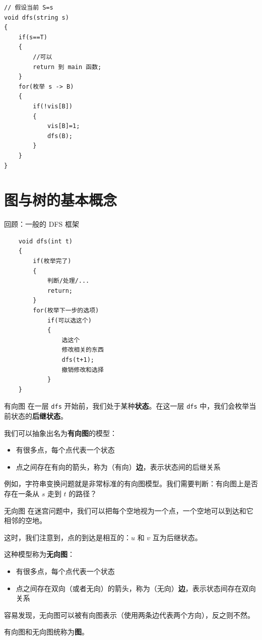\documentclass[11pt,aspectratio=169]{beamer}
\begin{document}
\begin{frame}[fragile]
\begin{lstlisting}
// 假设当前 S=s 
void dfs(string s)
{
    if(s==T)
    {
        //可以
        return 到 main 函数;
    }
    for(枚举 s -> B)
    {
        if(!vis[B])
        {
            vis[B]=1;
            dfs(B);
        }
    }
}
\end{lstlisting}    
\end{frame}

\section{图与树的基本概念}

\begin{frame}[fragile]{回顾：一般的 DFS 框架}
    \begin{lstlisting}
    void dfs(int t)
    {
        if(枚举完了)
        {
            判断/处理/...
            return;
        }
        for(枚举下一步的选项)
            if(可以选这个)
            {
                选这个
                修改相关的东西
                dfs(t+1);
                撤销修改和选择
            }
    }
    \end{lstlisting}
\end{frame}

\begin{frame}{有向图}
    在一层 \texttt{dfs} 开始前，我们处于某种\textbf{状态}。在这一层 \texttt{dfs} 中，我们会枚举当前状态的\textbf{后继状态}。

    我们可以抽象出名为\textbf{有向图}的模型：

    \begin{itemize}
        \item 有很多点，每个点代表一个状态
        \item 点之间存在有向的箭头，称为（有向）\textbf{边}，表示状态间的后继关系
    \end{itemize}

    例如，字符串变换问题就是非常标准的有向图模型。我们需要判断：有向图上是否存在一条从 $s$ 走到 $t$ 的路径？
\end{frame}

\begin{frame}{无向图}
    在迷宫问题中，我们可以把每个空地视为一个点，一个空地可以到达和它相邻的空地。

    这时，我们注意到，点的到达是相互的：$u$ 和 $v$ 互为后继状态。

    这种模型称为\textbf{无向图}：
    \begin{itemize}
        \item 有很多点，每个点代表一个状态
        \item 点之间存在双向（或者无向）的箭头，称为（无向）\textbf{边}，表示状态间存在双向关系
    \end{itemize}

    容易发现，无向图可以被有向图表示（使用两条边代表两个方向），反之则不然。

    有向图和无向图统称为\textbf{图}。
\end{frame}
\end{document}
